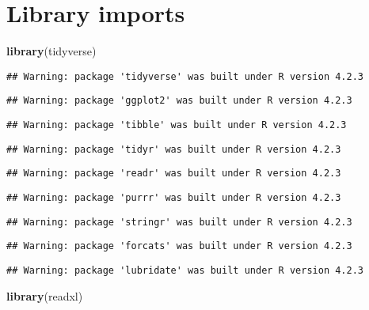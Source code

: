 \documentclass[
]{article}
\author{}
\date{\vspace{-2.5em}}
\newenvironment{Shaded}{\begin{snugshade}}{\end{snugshade}}
\newcommand{\FunctionTok}[1]{\textcolor[rgb]{0.13,0.29,0.53}{\textbf{#1}}}
\newcommand{\NormalTok}[1]{#1}
\begin{document}
\hypertarget{library-imports}{%
\section{Library imports}\label{library-imports}}

\begin{Shaded}
\begin{Highlighting}[]
\FunctionTok{library}\NormalTok{(tidyverse)}
\end{Highlighting}
\end{Shaded}

\begin{verbatim}
## Warning: package 'tidyverse' was built under R version 4.2.3
\end{verbatim}

\begin{verbatim}
## Warning: package 'ggplot2' was built under R version 4.2.3
\end{verbatim}

\begin{verbatim}
## Warning: package 'tibble' was built under R version 4.2.3
\end{verbatim}

\begin{verbatim}
## Warning: package 'tidyr' was built under R version 4.2.3
\end{verbatim}

\begin{verbatim}
## Warning: package 'readr' was built under R version 4.2.3
\end{verbatim}

\begin{verbatim}
## Warning: package 'purrr' was built under R version 4.2.3
\end{verbatim}

\begin{verbatim}
## Warning: package 'stringr' was built under R version 4.2.3
\end{verbatim}

\begin{verbatim}
## Warning: package 'forcats' was built under R version 4.2.3
\end{verbatim}

\begin{verbatim}
## Warning: package 'lubridate' was built under R version 4.2.3
\end{verbatim}

\begin{Shaded}
\begin{Highlighting}[]
\FunctionTok{library}\NormalTok{(readxl)}
\end{Highlighting}
\end{Shaded}
\end{document}
